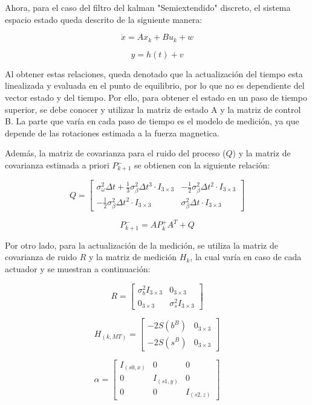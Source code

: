 Ahora, para el caso del filtro del kalman "Semiextendido" discreto, el sistema espacio estado queda descrito de la siguiente manera:

\[
\dot{x} = Ax_{k} + Bu_{k} + w
\]

\[
y = h(t) + v
\]

Al obtener estas relaciones, queda denotado que la actualización del tiempo esta linealizada y evaluada en el punto de equilibrio, por lo que no es dependiente del vector estado y del tiempo. Por ello, para obtener el estado en un paso de tiempo superior, se debe conocer y utilizar la matriz de estado A y la matriz de control B. La parte que varía en cada paso de tiempo es el modelo de medición, ya que depende de las rotaciones estimada a la fuerza magnetica.

Además, la matriz de covarianza para el ruido del proceso ($Q$) y la matriz de covarianza estimada a priori $P_{k+1}^{-}$ se obtienen con la siguiente relación:


\[
Q = \begin{bmatrix}
	\sigma_\omega^2 \Delta t + \frac{1}{3} \sigma_\beta^2 \Delta t^3 \cdot I_{3 \times 3} & -\frac{1}{2} \sigma_\beta^2 \Delta t^2 \cdot I_{3 \times 3} \\
	-\frac{1}{2} \sigma_\beta^2 \Delta t^2 \cdot I_{3 \times 3} & \sigma_\beta^2 \Delta t \cdot I_{3 \times 3}
\end{bmatrix}
\]

\[
P_{k+1}^{-} = A P_{k}^{+} A^{T} + Q
\]

Por otro lado, para la actualización de la medición, se utiliza la matriz de covarianza de ruido $R$ y la matriz de medición $H_{k}$, la cual varía en caso de cada actuador y se muestran a continuación:

\[
R = \begin{bmatrix}
	\sigma_b^2 I_{3 \times 3} & 0_{3 \times 3} \\
	0_{3 \times 3} & \sigma_s^2 I_{3 \times 3}
\end{bmatrix}
\]


\[
H_{(k,MT)} = \begin{bmatrix}
	-2S(b^B) & 0_{3 \times 3} \\
	-2S(s^B) & 0_{3 \times 3}
\end{bmatrix}
\]

\[
\alpha = \begin{bmatrix}
	I_{(s0,x)} & 0 & 0 \\
	0 & I_{(s1,y)} & 0 \\
	0 & 0 & I_{(s2,z)}
\end{bmatrix}
\]

